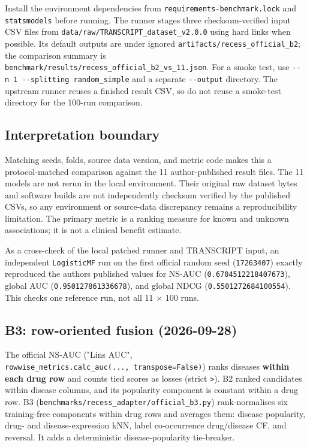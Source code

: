 \documentclass[
  10pt,
]{ctexart}
\begin{document}
Install the environment dependencies from
\texttt{requirements-benchmark.\allowbreak{}lock} and \texttt{statsmodels} before
running. The runner stages three checksum-verified input CSV files from
\texttt{data/\allowbreak{}raw/\allowbreak{}TRANSCRIPT\_\allowbreak{}dataset\_\allowbreak{}v2.\allowbreak{}0.\allowbreak{}0} using hard links when
possible. Its default outputs are under ignored
\texttt{artifacts/\allowbreak{}recess\_\allowbreak{}official\_\allowbreak{}b2}; the comparison summary is
\texttt{benchmark/\allowbreak{}results/\allowbreak{}recess\_\allowbreak{}official\_\allowbreak{}b2\_\allowbreak{}vs\_\allowbreak{}11.\allowbreak{}json}. For a
smoke test, use \texttt{-\/\allowbreak{}-n\ 1\ -\/\allowbreak{}-splitting\ random\_\allowbreak{}simple} and a
separate \texttt{-\/\allowbreak{}-output} directory. The upstream runner reuses a
finished result CSV, so do not reuse a smoke-test directory for the
100-run comparison.

\subsection{Interpretation boundary}\label{interpretation-boundary}

Matching seeds, folds, source data version, and metric code makes this a
protocol-matched comparison against the 11 author-published result
files. The 11 models are not rerun in the local environment. Their
original raw dataset bytes and software builds are not independently
checksum verified by the published CSVs, so any environment or
source-data discrepancy remains a reproducibility limitation. The
primary metric is a ranking measure for known and unknown associations;
it is not a clinical benefit estimate.

As a cross-check of the local patched runner and TRANSCRIPT input, an
independent \texttt{LogisticMF} run on the first official random seed
(\texttt{17263407}) exactly reproduced the authors\textquotesingle{}
published values for NS-AUC (\texttt{0.\allowbreak{}6704512218407673}), global AUC
(\texttt{0.\allowbreak{}950127861336678}), and global NDCG
(\texttt{0.\allowbreak{}5501272684100554}). This checks one reference run, not all 11
× 100 runs.

\subsection{B3: row-oriented fusion
(2026-09-28)}\label{b3-row-oriented-fusion-2026-09-28}

The official NS-AUC ("Lin\textquotesingle s AUC",
\texttt{rowwise\_\allowbreak{}metrics.\allowbreak{}calc\_\allowbreak{}auc(.\allowbreak{}.\allowbreak{}.\allowbreak{},\ transpose=False)}) ranks
diseases \textbf{within each drug row} and counts tied scores as losses
(strict \texttt{\textgreater{}}). B2 ranked candidates within disease
columns, and its popularity component is constant within a drug row. B3
(\texttt{benchmarks/\allowbreak{}recess\_\allowbreak{}adapter/\allowbreak{}official\_\allowbreak{}b3.\allowbreak{}py}) rank-normalises
six training-free components within drug rows and averages them: disease
popularity, drug- and disease-expression kNN, label co-occurrence
drug/disease CF, and reversal. It adds a deterministic
disease-popularity tie-breaker.
\end{document}
